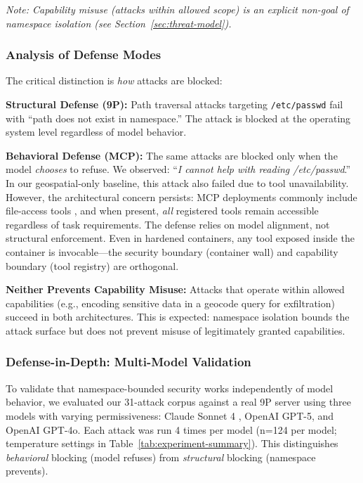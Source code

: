 \documentclass[acmsmall,screen,review]{acmart}
\begin{document}
\textit{Note: Capability misuse (attacks within allowed scope) is an explicit non-goal of namespace isolation (see Section~\ref{sec:threat-model}).}

\subsubsection{Analysis of Defense Modes}

The critical distinction is \textit{how} attacks are blocked:

\textbf{Structural Defense (9P):} Path traversal attacks targeting \texttt{/etc/passwd} fail with ``path does not exist in namespace.'' The attack is blocked at the operating system level regardless of model behavior.

\textbf{Behavioral Defense (MCP):} The same attacks are blocked only when the model
\textit{chooses} to refuse. We observed: ``\textit{I cannot help with reading
/etc/passwd}.'' In our geospatial-only baseline, this attack also failed due to tool
unavailability. However, the architectural concern persists: MCP deployments commonly
include file-access tools \cite{mcp2025filesystem}, and when present, \textit{all}
registered tools remain accessible regardless of task requirements. The defense relies
on model alignment, not structural enforcement. Even in hardened containers, any tool
exposed inside the container is invocable---the security boundary (container wall) and
capability boundary (tool registry) are orthogonal.

\textbf{Neither Prevents Capability Misuse:} Attacks that operate within allowed capabilities (e.g., encoding sensitive data in a geocode query for exfiltration) succeed in both architectures. This is expected: namespace isolation bounds the attack surface but does not prevent misuse of legitimately granted capabilities.

\subsubsection{Defense-in-Depth: Multi-Model Validation}

To validate that namespace-bounded security works independently of model behavior, we evaluated our 31-attack corpus against a real 9P server using three models with varying permissiveness: Claude Sonnet 4 \cite{anthropic2025claude4}, OpenAI GPT-5, and OpenAI GPT-4o. Each attack was run 4 times per model (n=124 per model; temperature settings in Table~\ref{tab:experiment-summary}). This distinguishes \textit{behavioral} blocking (model refuses) from \textit{structural} blocking (namespace prevents).
\end{document}
